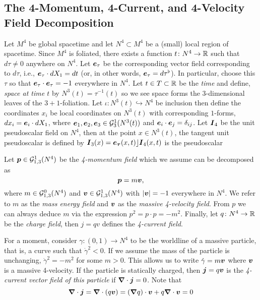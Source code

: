\subsection{The 4-Momentum, 4-Current, and 4-Velocity Field Decomposition}

Let $M^4$ be global spacetime and let $N^4\subset M^4$ be a (small) local region of spacetime. Since $M^4$ is foliated, there exists a function $t \colon N^4 \to \mathbb{R}$ such that $d\tau \neq 0$ anywhere on $N^4$. Let $\boldsymbol{e}_\tau$ be the corresponding vector field corresponding to $d\tau$, i.e., $\boldsymbol{e}_\tau \cdot dX_1 = dt$ (or, in other words, $\boldsymbol{e}_\tau = d\tau^\flat$).  In particular, choose this $\tau$ so that $\boldsymbol{e}_\tau\cdot \boldsymbol{e}_\tau = -1$ everywhere in $N^4$.  Let $t\in T\subset \mathbb{R}$ be the \emph{time} and define, \emph{space at time $t$} by $N^3(t)=\tau^{-1}(t)$ so we see space forms the $3$-dimensional leaves of the $3+1$-foliation. Let $\iota\colon N^3(t)\hookrightarrow N^4$ be inclusion then define the coordinates $x_{i}$ be local coordinates on $N^3(t)$ with corresponding $1$-forms, $dx_i = \boldsymbol{e}_i \cdot dX_1$, where $\boldsymbol{e}_1,\boldsymbol{e}_2,\boldsymbol{e}_3\in \mathcal{G}_{3}^1(N^3(t))$ and $\boldsymbol{e}_i\cdot \boldsymbol{e}_j = \delta_{ij}$. Let $\boldsymbol{I}_4$ be the unit pseudoscalar field on $N^4$, then at the point $x \in N^3(t)$, the tangent unit pseudoscalar is defined by $\boldsymbol{I}_3(x) = \boldsymbol{e_\tau}(x,t)\rfloor \boldsymbol{I}_4(x,t)$ is the pseudoscalar 

Let $\boldsymbol{p}\in \mathcal{G}_{1,3}^1(N^4)$ be the \emph{4-momentum field} which we assume can be decomposed as
\begin{equation}
    \boldsymbol{p} = m \boldsymbol{v},
\end{equation}
where $m\in \mathcal{G}_{1,3}^0(N^4)$ and $\boldsymbol{v} \in \mathcal{G}_{1,3}^1(N^4)$ with $|\boldsymbol{v}|=-1$ everywhere in $N^4$. We refer to $m$ as the \emph{mass energy field} and $\boldsymbol{v}$ as the \emph{massive 4-velocity field}. From $p$ we can always deduce $m$ via the expression $p^2 = p\cdot p = -m^2$. Finally, let $q\colon N^4 \to \mathbb{R}$ be the \emph{charge field}, then $j=qv$ defines the \emph{4-current field}.

For a moment, consider $\gamma \colon (0,1) \to N^4$ to be the worldline of a massive particle, that is, a curve such that $\dot{\gamma}^2<0$. If we assume the mass of the particle is unchanging, $\dot{\gamma}^2=-m^2$ for some $m>0$. This allows us to write $\dot{\gamma}=m\boldsymbol{v}$ where $\boldsymbol{v}$ is a massive 4-velocity. If the particle is statically charged, then $\boldsymbol{j}=q\boldsymbol{v}$ is the \emph{4-current vector field of this particle} if $\boldsymbol{\nabla} \cdot \boldsymbol{j} = 0$. Note that
\begin{equation}
    \boldsymbol{\nabla} \cdot \boldsymbol{j} = \boldsymbol{\nabla} \cdot (q\boldsymbol{v}) = (\boldsymbol{\nabla} q) \cdot \boldsymbol{v} + q\boldsymbol{\nabla} \cdot \boldsymbol{v} = 0
\end{equation}

